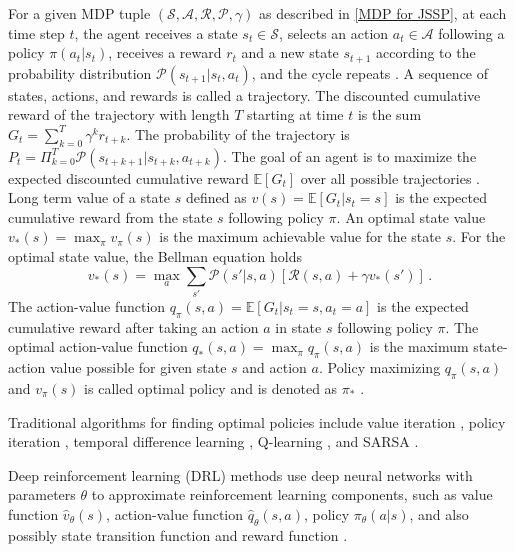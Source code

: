 For a given MDP tuple $(\mathcal{S}, \mathcal{A}, \mathcal{R}, \mathcal{P}, \gamma)$ as described in \ref{MDP for JSSP}, at each time step $t$, the agent receives a state $s_t \in \mathcal{S}$, selects an action $a_t \in \mathcal{A}$ following a policy $\pi(a_t|s_t)$, receives a reward $r_t$ and a new state $s_{t+1}$ according to the probability distribution $\mathcal{P}(s_{t+1} | s_t, a_t)$, and the cycle repeats \cite{DBLP:journals/corr/Li17b}. A sequence of states, actions, and rewards is called a trajectory. The discounted cumulative reward of the trajectory with length $T$ starting at time $t$ is the sum $G_t = \sum_{k=0}^T \gamma^k r_{t+k}$. The probability of the trajectory is $P_t = \Pi_{k=0}^T \mathcal{P}(s_{t+k+1} | s_{t+k}, a_{t+k})$. The goal of an agent is to maximize the expected discounted cumulative reward $\mathbb{E}[G_t]$ over all possible trajectories \cite{DBLP:journals/corr/Li17b}. Long term value of a state $s$ defined as $v(s) = \mathbb{E}\left [ G_t | s_t = s \right ]$ is the expected cumulative reward from the state $s$ following policy $\pi$. An optimal state value $v_*(s) = \max_\pi v_\pi(s)$ is the maximum achievable value for the state $s$. For the optimal state value, the Bellman equation holds \cite{DBLP:journals/corr/Li17b}
\begin{equation}
	v_*(s) = \max_a \sum_{s'} \mathcal{P} (s' | s,a)\left [ \mathcal{R}(s, a) + \gamma v_*(s') \right ] \, .
\end{equation}
The action-value function $q_\pi(s,a) = \mathbb{E} \left [ G_t | s_t=s, a_t=a\right ]$ is the expected cumulative reward after taking an action $a$ in state $s$ following policy $\pi$. The optimal action-value function $q_* (s,a) = \max_\pi q_\pi(s, a)$ is the maximum state-action value possible for given state $s$ and action $a$. Policy maximizing $q_\pi(s,a)$ and $v_\pi(s)$ is called optimal policy and is denoted as $\pi_*$ \cite{DBLP:journals/corr/Li17b}.
\par
Traditional algorithms for finding optimal policies include value iteration \cite{barto1989learning}, policy iteration \cite{Howard1960DynamicPA}, temporal difference learning \cite{tesauro1995temporal}, Q-learning \cite{watkins1992q}, and SARSA \cite{sarsa}.
\par
Deep reinforcement learning (DRL) methods use deep neural networks with parameters $\theta$ to approximate reinforcement learning components, such as value function $\hat{v}_\theta(s)$, action-value function $\hat{q}_\theta(s, a)$, policy $\pi_\theta(a|s)$, and also possibly state transition function and reward function \cite{DBLP:journals/corr/Li17b}. 

